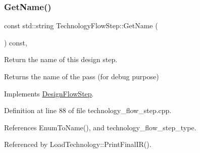 \subsubsection{\texorpdfstring{Get\+Name()}{GetName()}}
{\footnotesize\ttfamily const std\+::string Technology\+Flow\+Step\+::\+Get\+Name (\begin{DoxyParamCaption}{ }\end{DoxyParamCaption}) const\hspace{0.3cm}{\ttfamily [override]}, {\ttfamily [virtual]}}



Return the name of this design step. 

\begin{DoxyReturn}{Returns}
the name of the pass (for debug purpose) 
\end{DoxyReturn}


Implements \hyperlink{classDesignFlowStep_a01e5ebfab88db3b3b7f832f80075fad8}{Design\+Flow\+Step}.



Definition at line 88 of file technology\+\_\+flow\+\_\+step.\+cpp.



References Enum\+To\+Name(), and technology\+\_\+flow\+\_\+step\+\_\+type.



Referenced by Load\+Technology\+::\+Print\+Final\+I\+R().

